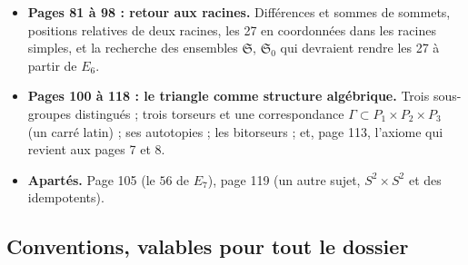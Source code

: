 \documentclass[11pt,a4paper]{article}
\begin{document}
\begin{itemize}
  polygones et polyèdres.
\item \textbf{Pages 81 à 98 : retour aux racines.} Différences et sommes de
  sommets, positions relatives de deux racines, les 27 en coordonnées dans
  les racines simples, et la recherche des ensembles $\mathfrak{S}$,
  $\mathfrak{S}_0$ qui devraient rendre les 27 à partir de $E_6$.
\item \textbf{Pages 100 à 118 : le triangle comme structure algébrique.}
  Trois sous-groupes distingués ; trois torseurs et une correspondance
  $\Gamma \subset P_1 \times P_2 \times P_3$ (un carré latin) ; ses
  autotopies ; les bitorseurs ; et, page 113, l'axiome qui revient aux pages
  7 et 8.
\item \textbf{Apartés.} Page 105 (le $56$ de $E_7$), page 119 (un
  autre sujet, $S^2 \times S^2$ et des idempotents).
\end{itemize}

\subsection*{Conventions, valables pour tout le dossier}
\end{document}
